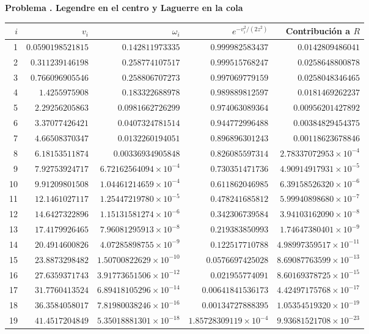 \documentclass[11pt,a4paper]{article}
\theoremstyle{definition}
\newcounter{problema}
\newenvironment{resuelto}[1]{\refstepcounter{problema}\par\medskip\Needspace{6\baselineskip}\textbf{Problema \theproblema. #1}\par}{\par\medskip}
\begin{document}
\begin{resuelto}{Legendre en el centro y Laguerre en la cola}
\begin{center}\small\begin{tabular}{rrrrr}
\toprule
$i$&$v_i$&$\omega_i$&$e^{-v_i^2/(2z^2)}$&Contribución a $R$\\
\midrule
1&$0.0590198521815$&$0.142811973335$&$0.999982583437$&$0.0142809486041$\\
2&$0.311239146198$&$0.258774107517$&$0.999515768247$&$0.0258648800878$\\
3&$0.766096905546$&$0.258806707273$&$0.997069779159$&$0.0258048346465$\\
4&$1.4255975908$&$0.183322688978$&$0.989889812597$&$0.0181469262237$\\
5&$2.29256205863$&$0.0981662726299$&$0.974063089364$&$0.00956201427892$\\
6&$3.37077426421$&$0.0407324781514$&$0.944772996488$&$0.00384829454375$\\
7&$4.66508370347$&$0.0132260194051$&$0.896896301243$&$0.00118623678846$\\
8&$6.18153511874$&$0.00336934905848$&$0.826085597314$&$2.78337072953\times10^{-4}$\\
9&$7.92753924717$&$6.72162564094\times10^{-4}$&$0.730351471736$&$4.90914917931\times10^{-5}$\\
10&$9.91209801508$&$1.04461214659\times10^{-4}$&$0.611862046985$&$6.39158526320\times10^{-6}$\\
11&$12.1461027117$&$1.25447219780\times10^{-5}$&$0.478241685812$&$5.99940898680\times10^{-7}$\\
12&$14.6427322896$&$1.15131581274\times10^{-6}$&$0.342306739584$&$3.94103162090\times10^{-8}$\\
13&$17.4179926465$&$7.96081295913\times10^{-8}$&$0.219383850993$&$1.74647380401\times10^{-9}$\\
14&$20.4914600826$&$4.07285898755\times10^{-9}$&$0.122517710788$&$4.98997359517\times10^{-11}$\\
15&$23.8873298482$&$1.50700822629\times10^{-10}$&$0.0576697425028$&$8.69087763599\times10^{-13}$\\
16&$27.6359371743$&$3.91773651506\times10^{-12}$&$0.021955774091$&$8.60169378725\times10^{-15}$\\
17&$31.7760413524$&$6.89418105296\times10^{-14}$&$0.00641841536173$&$4.42497175768\times10^{-17}$\\
18&$36.3584058017$&$7.81980038246\times10^{-16}$&$0.00134727888395$&$1.05354519320\times10^{-19}$\\
19&$41.4517204849$&$5.35018881301\times10^{-18}$&$1.85728309119\times10^{-4}$&$9.93681521708\times10^{-23}$\\

\end{tabular}
\end{center}
\end{resuelto}
\end{document}
